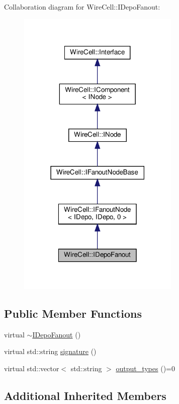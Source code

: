Collaboration diagram for Wire\+Cell\+:\+:I\+Depo\+Fanout\+:
\nopagebreak
\begin{figure}[H]
\begin{center}
\leavevmode
\includegraphics[width=219pt]{class_wire_cell_1_1_i_depo_fanout__coll__graph}
\end{center}
\end{figure}
\subsection*{Public Member Functions}
\begin{DoxyCompactItemize}
\item 
virtual \hyperlink{class_wire_cell_1_1_i_depo_fanout_ad68fb48fa728917a8dfe9efc89537e02}{$\sim$\+I\+Depo\+Fanout} ()
\item 
virtual std\+::string \hyperlink{class_wire_cell_1_1_i_depo_fanout_a1c41ee7c457b895198b509027686bd53}{signature} ()
\item 
virtual std\+::vector$<$ std\+::string $>$ \hyperlink{class_wire_cell_1_1_i_depo_fanout_ade8cfbdf790d316516ab8f7a97818f8e}{output\+\_\+types} ()=0
\end{DoxyCompactItemize}
\subsection*{Additional Inherited Members}


